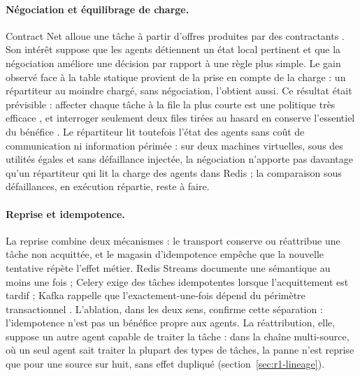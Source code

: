 \paragraph{Négociation et équilibrage de charge.}
Contract Net alloue une tâche à partir d'offres produites par des contractants
\cite{smith1980contract,fipa2002contractnet}. Son intérêt suppose que les agents détiennent
un état local pertinent et que la négociation améliore une décision par rapport à une règle
plus simple. Le gain observé face à la table statique provient de la prise en compte de la
charge : un répartiteur au moindre chargé, sans négociation, l'obtient aussi. Ce résultat
était prévisible : affecter chaque tâche à la file la plus courte est une politique très
efficace \cite{winston1977shortest}, et interroger seulement deux files tirées au hasard en
conserve l'essentiel du bénéfice \cite{azar1999balanced,mitzenmacher2001power}. Le
répartiteur lit toutefois l'état des agents sans coût de communication ni information
périmée : sur deux machines virtuelles, sous des utilités égales et sans défaillance injectée,
la négociation n'apporte pas davantage qu'un répartiteur qui lit la charge des agents dans Redis ;
la comparaison sous défaillances, en exécution répartie, reste à faire.

\paragraph{Reprise et idempotence.}
La reprise combine deux mécanismes : le transport conserve ou réattribue une tâche non
acquittée, et le magasin d'idempotence empêche que la nouvelle tentative répète l'effet
métier. Redis Streams documente une sémantique au moins une fois \cite{redis2026streams} ;
Celery exige des tâches idempotentes lorsque l'acquittement est tardif
\cite{celery2026tasks} ; Kafka rappelle que l'exactement-une-fois dépend du périmètre
transactionnel \cite{kafka2026semantics}. L'ablation, dans les deux sens, confirme cette
séparation : l'idempotence n'est pas un bénéfice propre aux agents. La réattribution, elle,
suppose un autre agent capable de traiter la tâche : dans la chaîne multi-source, où un seul
agent sait traiter la plupart des types de tâches, la panne n'est reprise que pour une source
sur huit, sans effet dupliqué (section~\ref{sec:r1-lineage}).

